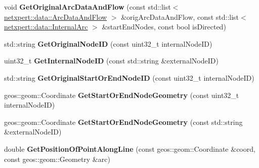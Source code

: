 \begin{DoxyCompactItemize}
\item 
void {\bfseries Get\+Original\+Arc\+Data\+And\+Flow} (const std\+::list$<$ \hyperlink{structnetxpert_1_1data_1_1ArcDataAndFlow}{netxpert\+::data\+::\+Arc\+Data\+And\+Flow} $>$ \&orig\+Arc\+Data\+And\+Flow, const std\+::list$<$ \hyperlink{structnetxpert_1_1data_1_1InternalArc}{netxpert\+::data\+::\+Internal\+Arc} $>$ \&start\+End\+Nodes, const bool is\+Directed)\hypertarget{classnetxpert_1_1Network_a13f5bce79c5903de3fdbcd9306f81c3c}{}\label{classnetxpert_1_1Network_a13f5bce79c5903de3fdbcd9306f81c3c}

\item 
std\+::string {\bfseries Get\+Original\+Node\+ID} (const uint32\+\_\+t internal\+Node\+ID)\hypertarget{classnetxpert_1_1Network_a37216bfc5f4a99673e2462735bb95eed}{}\label{classnetxpert_1_1Network_a37216bfc5f4a99673e2462735bb95eed}

\item 
uint32\+\_\+t {\bfseries Get\+Internal\+Node\+ID} (const std\+::string \&external\+Node\+ID)\hypertarget{classnetxpert_1_1Network_a560e8f37ea1ad8913c7de0e0207fc21a}{}\label{classnetxpert_1_1Network_a560e8f37ea1ad8913c7de0e0207fc21a}

\item 
std\+::string {\bfseries Get\+Original\+Start\+Or\+End\+Node\+ID} (const uint32\+\_\+t internal\+Node\+ID)\hypertarget{classnetxpert_1_1Network_a9acedaeb83b35ceb7deefc25f5928b28}{}\label{classnetxpert_1_1Network_a9acedaeb83b35ceb7deefc25f5928b28}

\item 
geos\+::geom\+::\+Coordinate {\bfseries Get\+Start\+Or\+End\+Node\+Geometry} (const uint32\+\_\+t internal\+Node\+ID)\hypertarget{classnetxpert_1_1Network_a5b86b8890e4fe80490bc7411b600a31a}{}\label{classnetxpert_1_1Network_a5b86b8890e4fe80490bc7411b600a31a}

\item 
geos\+::geom\+::\+Coordinate {\bfseries Get\+Start\+Or\+End\+Node\+Geometry} (const std\+::string \&external\+Node\+ID)\hypertarget{classnetxpert_1_1Network_ad9d88b812c60844c3389f31dcba91135}{}\label{classnetxpert_1_1Network_ad9d88b812c60844c3389f31dcba91135}

\item 
double {\bfseries Get\+Position\+Of\+Point\+Along\+Line} (const geos\+::geom\+::\+Coordinate \&coord, const geos\+::geom\+::\+Geometry \&arc)\hypertarget{classnetxpert_1_1Network_a857964ff4546ee369d9b1f0581e8a1de}{}\label{classnetxpert_1_1Network_a857964ff4546ee369d9b1f0581e8a1de}


\end{DoxyCompactItemize}
